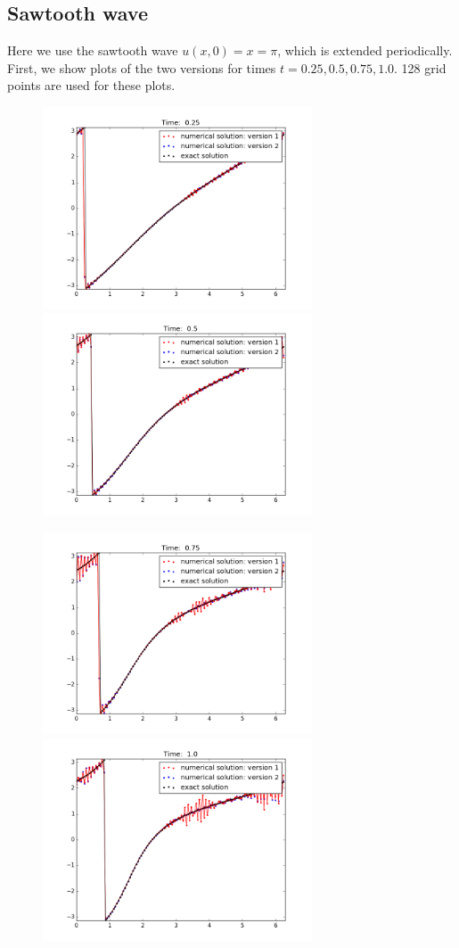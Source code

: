 \documentclass[12pt]{article}
\begin{document}
\subsection*{Sawtooth wave}
Here we use the sawtooth wave $u(x, 0) = x = \pi$, which is extended periodically. First, we show plots of the two versions for times $t = 0.25, 0.5, 0.75, 1.0$. 128 grid points are used for these plots.
\begin{figure}[H]
\includegraphics[width=8cm]{images/2frame1.png}
\includegraphics[width=8cm]{images/2frame2.png}
\end{figure}
\begin{figure}[H]
\includegraphics[width=8cm]{images/2frame3.png}
\includegraphics[width=8cm]{images/2frame4.png}
\end{figure}
\end{document}
